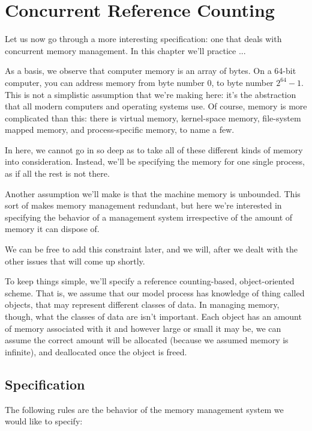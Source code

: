 \chapter{Concurrent Reference Counting}\label{ch:concurrent-reference-counting}

Let us now go through a more interesting specification: one that deals with concurrent memory management.
In this chapter we'll practice ...

As a basis, we observe that computer memory is an array of bytes.
On a 64-bit computer, you can address memory from byte number 0, to byte number $2^{64} - 1$.
This is not a simplistic assumption that we're making here: it's the abstraction that all modern computers and operating systems use.
Of course, memory is more complicated than this: there is virtual memory, kernel-space memory, file-system mapped memory, and process-specific memory, to name a few.

In here, we cannot go in so deep as to take all of these different kinds of memory into consideration.
Instead, we'll be specifying the memory for one single process, as if all the rest is not there.

Another assumption we'll make is that the machine memory is unbound\-ed.
This sort of makes memory management redundant, but here we're interested in specifying the behavior of a management system irrespective of the amount of memory it can dispose of.

We can be free to add this constraint later, and we will, after we dealt with the other issues that will come up shortly.

To keep things simple, we'll specify a reference counting-based, object-oriented scheme.
That is, we assume that our model process has knowledge of thing called objects, that may represent different classes of data.
In managing memory, though, what the classes of data are isn't important.
Each object has an amount of memory associated with it and however large or small it may be, we can assume the correct amount will be allocated (because we assumed memory is infinite), and deallocated once the object is freed.

\section{Specification}\label{sec:specification}

The following rules are the behavior of the memory management system we would like to specify:

